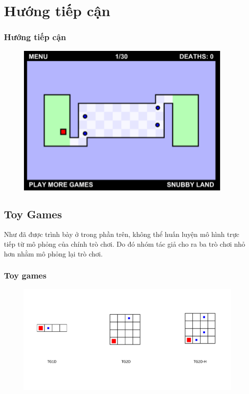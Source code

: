 \documentclass{beamer}
\begin{document}
\section{Hướng tiếp cận}
\begin{frame}
\frametitle{Hướng tiếp cận}
\begin{figure}[h]
    \centering
    \includegraphics{photo/lv1game.png}
\end{figure}
\end{frame}

\subsection{Toy Games}
\begin{frame}
Như đã được trình bày ở trong phần trên, không thể huấn luyện mô hình trực tiếp từ mô phỏng của chính trò chơi. Do đó nhóm tác giả cho ra ba trò chơi nhỏ hơn nhằm mô phỏng lại trò chơi.
\frametitle{Toy games}
\begin{figure}[h]
    \centering
    \includegraphics[scale=0.4]{photo/Toygame.png}
\end{figure}
\end{frame}
\end{document}
